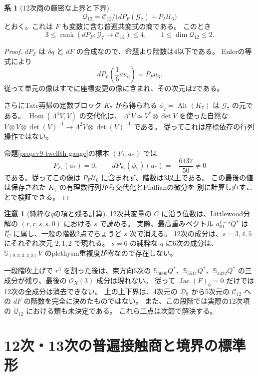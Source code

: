 \documentclass[a4paper,11pt]{ltjsarticle}
\theoremstyle{definition}
\newtheorem{remark}[theorem]{注意}
\newtheorem{corollary}[theorem]{系}
\newcommand{\OO}{\mathcal O}
\begin{document}
\begin{corollary}[12次商の厳密な上界と下界]
\label{cor:degree-twelve-contact-bounds}
\[
 \mathcal Q_{12}=
 \mathcal C_{12}/\bigl(dP_F(\mathcal G_7)+P_F\mathcal U_6\bigr)
\]
とおく。これは $F$ も変数に含む普遍共変式の商である。
このとき
\[
 \boxed{
 3\le\operatorname{rank}(dP_F\colon\mathcal G_7\to\mathcal C_{12})\le4,
 \qquad 1\le\dim\mathcal Q_{12}\le2.
 }
\]
\end{corollary}
\begin{proof}
$dP_F$ は $\delta q$ と $dF$ の合成なので、命題より階数は4以下である。
Eulerの等式により
\[
 dP_F\left(\frac16a u_6\right)=P_Fu_6.
\]
従って単元の像はすでに座標変更の像に含まれ、その次元は2である。

さらにTate再帰の定数ブロック $K_7$ から得られる
$\phi_7=\operatorname{Alt}(K_7)$ は $\mathcal G_7$ の元である。
$\operatorname{Hom}(\Lambda^4V,V)$ の交代化は、
$\Lambda^4V\simeq V^*\otimes\det V$ を使った自然な
$V\otimes V\otimes\det(V)^{-1}\to
\Lambda^2V\otimes\det(V)^{-1}$ である。
従ってこれは座標依存の行列操作ではない。

命題\ref{prop:v9-twelfth-gauge}の標本 $(F_*,a_*)$ では
\[
 P_{F_*}(a_*)=0,\qquad
 dP_{F_*}(\phi_7)(a_*)=-\frac{6137}{50}\ne0
\]
である。従ってこの像は $P_F\mathcal U_6$ に含まれず、階数は3以上である。
この最後の値は保存された $K_7$ の有理数行列から交代化とPfaffianの微分を
別に計算し直すことで検証できる。
\end{proof}

\begin{remark}[純粋な$q$の項と残る計算]
12次共変量の $C$ に沿う位数は、Littlewood分解の
$(r,r,s,s,0)$ における $s$ で読める。
実際、最高重みベクトル $a_{01}^{r-s}Q^s$ は
$I_C^s$ に属し、一般の階数2点でちょうど $s$ 次で消える。
12次の成分は、$s=3,4,5$ にそれぞれ次元 $2,1,2$ で現れる。
$s=6$ の純粋な $q$ に6次の成分は、
$\mathbb S_{(9,3,3,3,3)}V$ のplethysm重複度が零なので存在しない。

一段階吹上げで $r^3$ を割った後は、束方向6次の
$\mathbb S_{6600}Q^*$、$\mathbb S_{5511}Q^*$、$\mathbb S_{4422}Q^*$
の三成分が残り、最後の $\OO_X(3)$ 成分は現れない。
従って $\operatorname{Jac}(F)_6=0$ だけでは12次の全成分は消去できない。
上の上下界は、4次元の $\mathcal D_8$ から5次元の $\mathcal C_{12}$ への
$dF$ の階数を完全に決めたものではない。
また、この段階では実際の12次項の $\mathcal Q_{12}$ における類も未決定である。
これら二点は次節で解決する。
\end{remark}



\clearpage
\section{12次・13次の普遍接触商と境界の標準形}
\label{sec:contact-twelve-thirteen}
\end{document}
